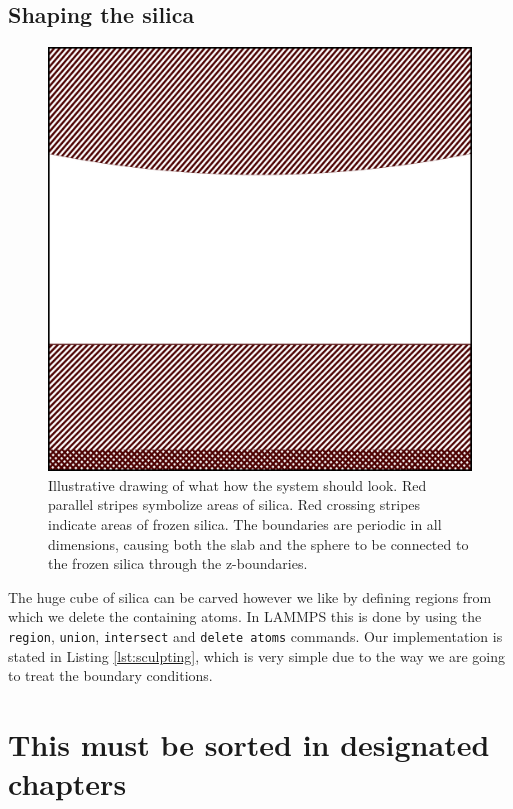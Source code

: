\documentclass[twoside,english]{uiofysmaster}
\begin{document}
\section{Shaping the silica}

\begin{figure}
	\centering
	\includegraphics[width=0.7\linewidth]{figures/CreatingSystem/drawing.pdf}
	\caption{Illustrative drawing of what how the system should look. Red parallel stripes symbolize areas of silica. Red crossing stripes indicate areas of frozen silica. The boundaries are periodic in all dimensions, causing both the slab and the sphere to be connected to the frozen silica through the z-boundaries.}
	\label{fig:drawing}
\end{figure}

The huge cube of silica can be carved however we like by defining regions from which we delete the containing atoms. In LAMMPS this is done by using the \texttt{region}, \texttt{union}, \texttt{intersect} and \texttt{delete atoms} commands. Our implementation is stated in Listing \ref{lst:sculpting}, which is very simple due to the way we are going to treat the boundary conditions. 





\chapter{This must be sorted in designated chapters}
\end{document}
